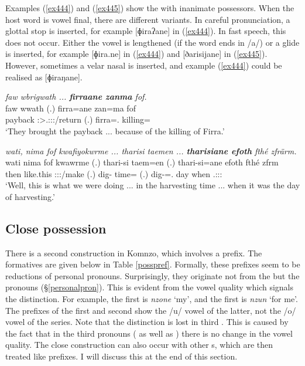 Examples (\ref{ex444}) and (\ref{ex445}) show the   with inanimate possessors. When the host word is vowel final, there are different variants. In careful pronunciation, a glottal stop is inserted, for example [ɸiraʔane] in (\ref{ex444}). In fast speech, this does not occur. Either the vowel is lengthened (if the word ends in /a/) or a glide is inserted, for example [ɸira.ne] in (\ref{ex444}) and [ðarisijane] in (\ref{ex445}). However, sometimes a velar nasal is inserted, and example (\ref{ex444}) could be realised as [ɸiraŋane]. 

\begin{exe}
	\ex \emph{faw wbrigwath ... \textbf{firraane zanma} fof.}\\
	\gll faw wwath (.) firra=ane zan=ma fof\\
	payback \Stpl:\Sbj>\Tsg.\F:\Obj:\Pst:\Ipfv/return (.) firra=\Poss.\Sg{} killing=\Char{} \Emph\\
	\trans `They brought the payback ... because of the killing of Firra.'\\
	\label{ex444}
\end{exe}
\begin{exe}
	\ex \emph{wati, nima fof kwafiyokwrme ... tharisi taemen ... \textbf{tharisiane efoth} fthé zfrärm.}\\
	\gll wati nima fof kwawrme (.) thari-si taem=en (.) thari-si=ane efoth fthé zfrm\\
	then {like.this} \Emph{} \Fpl:\Sbj:\Pst:\Dur/make (.) dig-\Nmlz{} time=\Loc{} (.) dig-\Nmlz=\Poss.\Sg{} day when \Tsg.\F:\Sbj:\Pst:\Dur{}\\
	\trans `Well, this is what we were doing ... in the harvesting time ... when it was the day of harvesting.'
	\label{ex445}
\end{exe}

\subsection{Close possession} \label{closeposs}

There is a second  construction in Komnzo, which involves a prefix. The formatives are given below in Table \ref{posspref}. Formally, these prefixes seem to be reductions of personal pronouns. Surprisingly, they originate not from the  but the  pronouns (\S{}\ref{personalpron}). This is evident from the vowel quality which signals the  distinction. For example, the first     is \emph{nzone} `my', and the first    is \emph{nzun} `for me'. The  prefixes of the first and second  show the /u/ vowel of the latter, not the /o/ vowel of the  series. Note that the  distinction is lost in third . This is caused by the fact that in the third  pronouns ( as well as ) there is no change in the vowel quality. The close  construction can also occur with other s, which are then treated like prefixes. I will discuss this at the end of this section.

